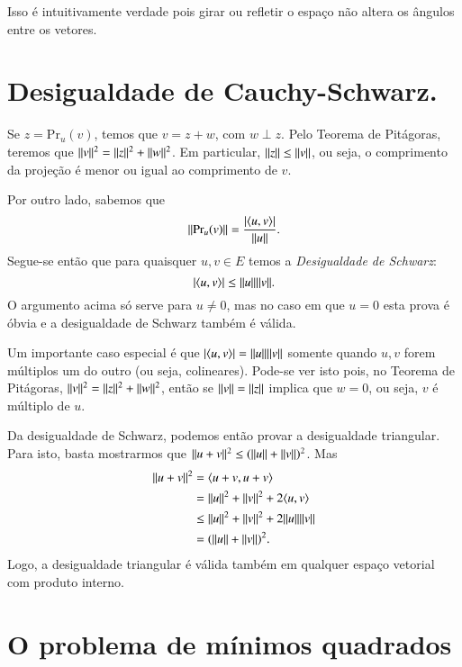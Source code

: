 Isso é intuitivamente verdade pois girar ou refletir o espaço não altera os ângulos entre os vetores.

\section{Desigualdade de Cauchy-Schwarz.}

Se $z=\text{Pr}_u(v)$, temos que $v=z+w$, com $w\perp z$. Pelo Teorema de Pitágoras, teremos que $\| v \|^2=\| z \|^2+\| w \|^2$. Em particular, $\| z \|\leq \| v \|$, ou seja, o comprimento da projeção é menor ou igual ao comprimento de $v$.

Por outro lado, sabemos que 
\begin{equation*}
	\| \text{Pr}_u(v) \| = \frac{|\langle u, v \rangle|}{\| u \|}.
\end{equation*}
Segue-se então que para quaisquer $u,v \in E$ temos a \emph{Desigualdade de Schwarz}:
\begin{equation*}
   |\langle u, v \rangle| \leq \| u \|\| v \|.
\end{equation*}
O argumento acima só serve para $u\ne 0$, mas no caso em que $u=0$ esta prova é óbvia e a desigualdade de Schwarz também é válida.

Um importante caso especial é que $|\langle u, v \rangle|=\| u \|\| v \|$ somente quando $u,v$ forem múltiplos um do outro (ou seja, colineares). Pode-se ver isto pois, no Teorema de Pitágoras, $\| v \|^2=\| z \|^2+\| w \|^2$, então se $\| v \|=\| z \|$ implica que $w=0$, ou seja, $v$ é múltiplo de $u$.

Da desigualdade de Schwarz, podemos então provar a desigualdade triangular. Para isto, basta mostrarmos que $\| u+v \|^2\leq (\| u \|+\| v \|)^2$. Mas
\begin{align*}
   \| u+v \|^2 &= \langle u+v, u+v \rangle\\
  	 &= \| u \|^2+\| v \|^2+2\langle u, v \rangle\\
     &\leq \| u \|^2+\| v \|^2 +2\| u \|\| v \|\\
	 &= (\| u \|+\| v \|)^2.
\end{align*}
Logo, a desigualdade triangular é válida também em qualquer espaço vetorial com produto interno.

\section{O problema de mínimos quadrados}

